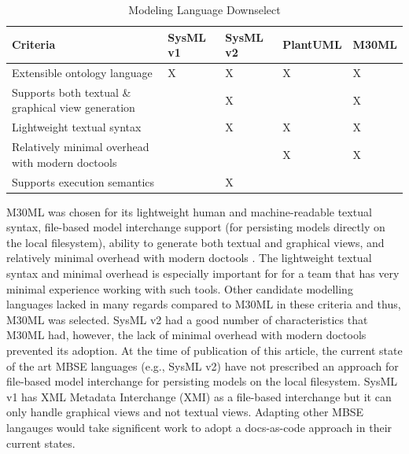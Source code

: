 \documentclass[journal,article,submit,pdftex,moreauthors]{Definitions/mdpi}
\begin{document}
\begin{table}[H] 
	\caption{Modeling Language Downselect}
	\label{tab:language}
	\begin{tabularx}{\textwidth}{CCCCC}
	\toprule
	\textbf{Criteria}  & \textbf{SysML v1}  & \textbf{SysML v2}  & \textbf{PlantUML}  & \textbf{M30ML}\\
	\midrule
	Extensible ontology language                       & X        & X        & X        & X     \\ \hline
	Supports both textual \& graphical view generation &          & X        &          & X     \\ \hline
	Lightweight textual syntax                         &          & X        & X        & X     \\ \hline
	Relatively minimal overhead with modern doctools   &          &          & X        & X     \\ \hline
	Supports execution semantics                       &          & X        &          &       \\
	\bottomrule
	\end{tabularx}
\end{table}

M30ML was chosen for its lightweight human and machine-readable textual syntax, file-based model interchange support (for persisting models directly on the local filesystem), ability to generate both textual and graphical views, and relatively minimal overhead with modern doctools \cite{mach30_git}.  The lightweight textual syntax and minimal overhead is especially important for for a team that has very minimal experience working with such tools.  Other candidate modelling languages lacked in many regards compared to M30ML in these criteria and thus, M30ML was selected.  SysML v2 had a good number of characteristics that M30ML had, however, the lack of minimal overhead with modern doctools prevented its adoption.  At the time of publication of this article, the current state of the art MBSE languages (e.g., SysML v2) have not prescribed an approach for file-based model interchange for persisting models on the local filesystem.  SysML v1 has XML Metadata Interchange (XMI) as a file-based interchange but it can only handle graphical views and not textual views.  Adapting other MBSE langauges would take significent work to adopt a docs-as-code approach in their current states.
\end{document}

